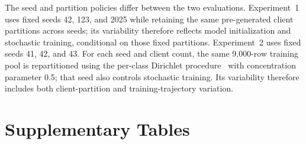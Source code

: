 \documentclass{article}
\begin{document}
The seed and partition policies differ between the two evaluations.
Experiment~1 uses fixed seeds 42, 123, and 2025 while retaining the same
pre-generated client partitions across seeds; its variability therefore
reflects model initialization and stochastic training, conditional on those
fixed partitions. Experiment~2 uses fixed seeds 41, 42, and 43. For each seed
and client count, the same 9,000-row training pool is repartitioned using the
per-class Dirichlet procedure~\cite{hsu2019nonidentical} with concentration
parameter 0.5; that seed also controls stochastic training. Its variability
therefore includes both client-partition and training-trajectory variation.

\section{Supplementary Tables}

\setcounter{table}{0}
\renewcommand{\thetable}{S\arabic{table}}
\renewcommand{\theHtable}{S\arabic{table}}
\end{document}
